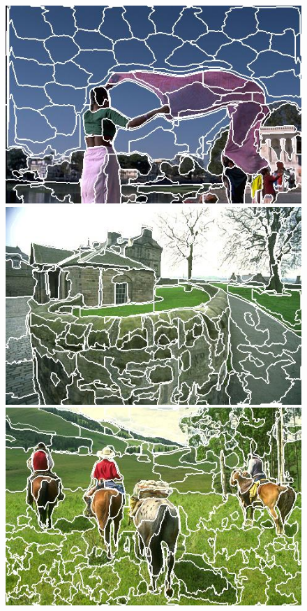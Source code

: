 \begin{figure}[h]
{\begin{minipage}[b]{0.13\linewidth}
\includegraphics[width=1\linewidth]{figures/img/SSN/SSN_80085.jpg}
\includegraphics[width=1\linewidth]{figures/img/SSN/SSN_92014.jpg}
\includegraphics[width=1\linewidth]{figures/img/SSN/SSN_220003.jpg}

\end{minipage}}
\end{figure}
